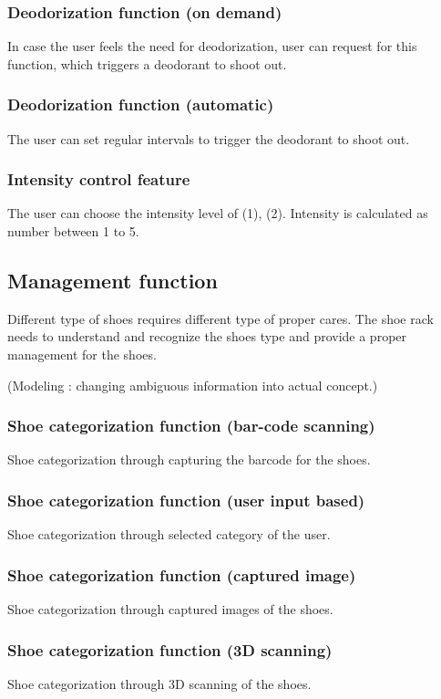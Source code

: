 \documentclass[conference]{IEEEtran}
\begin{document}
\subsubsection{Deodorization function (on demand)}
In case the user feels the need for deodorization, user can request for this function, which triggers a deodorant to shoot out.\\
\subsubsection{Deodorization function (automatic)}
The user can set regular intervals to trigger the deodorant to shoot out.\\
\subsubsection{Intensity control feature}
The user can choose the intensity level of (1), (2). Intensity is calculated as number between 1 to 5.\\


\subsection{Management function}
Different type of shoes requires different type of proper cares. The shoe rack needs to understand and recognize the shoes type and provide a proper management for the shoes.

(Modeling : changing ambiguous information into actual concept.)\\
\subsubsection{Shoe categorization function (bar-code scanning)}
Shoe categorization through capturing the barcode for the shoes.\\
\subsubsection{Shoe categorization function (user input based)}
Shoe categorization through selected category of the user.\\
\subsubsection{Shoe categorization function (captured image)}
Shoe categorization through captured images of the shoes.\\
\subsubsection{Shoe categorization function (3D scanning)}
Shoe categorization through 3D scanning of the shoes.\\
\end{document}
